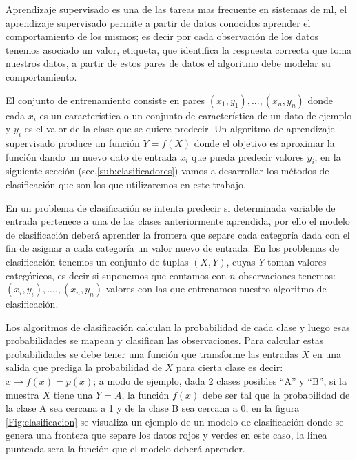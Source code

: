 Aprendizaje supervisado es una de las tareas mas frecuente en sistemas de \ac{ml}, el aprendizaje supervisado permite a partir de datos conocidos aprender el comportamiento de los mismos; es decir por cada observación de los datos tenemos asociado un valor, etiqueta, que identifica la respuesta correcta que toma nuestros datos, a partir de estos pares de datos el algoritmo debe modelar su comportamiento. 

El conjunto de entrenamiento consiste en pares $(x_1, y_1), ...,(x_n, y_n)$ donde cada $x_i$  es un característica o un conjunto de característica de un dato de ejemplo y $y_i$ es el valor de la clase que se quiere predecir. Un algoritmo de aprendizaje supervisado produce un función $Y = f(X)$ donde el objetivo es aproximar la función dando un nuevo dato de entrada $x_i$ que pueda predecir valores $y_i$, en la siguiente sección  (sec.\ref{sub:clasificadores}) vamos a desarrollar los métodos de clasificación que son los que utilizaremos en este trabajo.

En un problema de clasificación se intenta predecir si determinada variable de entrada pertenece a una de las clases anteriormente aprendida, por ello el modelo de clasificación deberá aprender la frontera que separe cada categoría dada con el fin de asignar a cada categoría un valor nuevo de entrada. En los problemas de clasificación tenemos un conjunto de tuplas $(X,Y)$, cuyas $Y$ toman valores categóricos, es decir si suponemos que contamos con $n$ observaciones tenemos: $(x_i,y_i),....,(x_n,y_n)$ valores con las que entrenamos nuestro algoritmo de clasificación. 

Los algoritmos de clasificación calculan la probabilidad de cada clase y luego esas probabilidades se mapean y  clasifican las observaciones. Para calcular estas probabilidades se debe tener una función que transforme las entradas $X$ en una salida que prediga la probabilidad de $X$ para cierta clase es decir: $ x \longrightarrow f(x) = p(x) $; a modo de ejemplo, dada 2 clases posibles “A” y “B”, si la muestra $X$ tiene una $Y = A$, la función $f(x)$ debe ser tal que la probabilidad de la clase A sea cercana a 1 y  de la clase B sea cercana a $0$, en la figura \ref{Fig:clasificacion} se visualiza un ejemplo de un modelo de clasificación donde se  genera una frontera que separe los datos rojos y verdes en este caso, la linea punteada sera la función que el modelo deberá aprender. 

